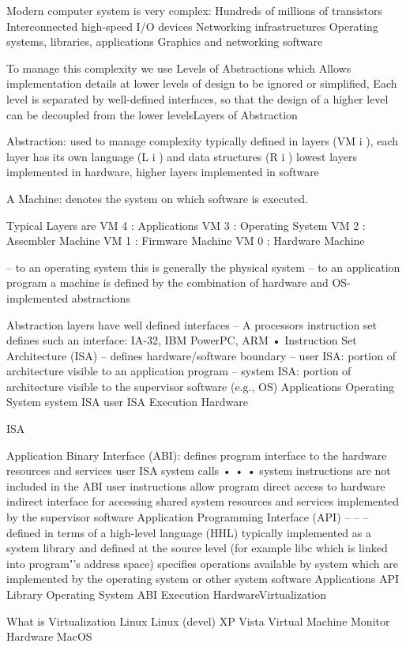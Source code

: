 
Modern computer system is very complex: 
Hundreds of millions of transistors
Interconnected high-speed I/O devices
Networking infrastructures
Operating systems, libraries, applications
Graphics and networking software


To manage this complexity we use Levels of Abstractions which
Allows implementation details at lower levels of design to be ignored or simplified,
Each level is separated by well-defined interfaces, so
that the design of a higher level can be decoupled
from the lower levelsLayers of Abstraction


Abstraction: used to manage complexity typically defined in layers (VM i ), each layer has its own language (L i ) and data structures (R i )   lowest layers implemented in hardware, higher layers implemented in
software

A Machine: denotes the system on which software is executed.

Typical Layers are 
VM 4 : Applications 
VM 3 : Operating System
VM 2 : Assembler Machine
VM 1 : Firmware Machine
VM 0 : Hardware Machine

–  to an operating system this is generally the physical system
–  to an application program a machine is defined by the combination of hardware and OS-implemented abstractions
 

Abstraction layers have well defined interfaces
–  A processors instruction set defines such an interface: IA-32, IBM
PowerPC, ARM
•  Instruction Set Architecture (ISA)
–  defines hardware/software boundary
–  user ISA: portion of architecture visible to an application program
–  system ISA: portion of architecture visible to the supervisor software
(e.g., OS)
Applications
Operating
System
system ISA
user ISA
Execution
Hardware

ISA

Application Binary Interface (ABI): defines program interface to the hardware resources and services 
user ISA
system calls
• 
• 
• 
system instructions are not included in the ABI
user instructions allow program direct access to hardware
indirect interface for accessing shared system resources and services
implemented by the supervisor software
Application Programming Interface (API)
– 
– 
– 
defined in terms of a high-level language (HHL)
typically implemented as a system library and defined at the source level (for example libc which is linked
into programʼ’s address space)
specifies operations available by system which are implemented by the operating system or other system
software
Applications
API
Library
Operating
System
ABI
Execution
HardwareVirtualization

What is Virtualization
Linux
Linux
(devel)
XP
Vista
Virtual Machine Monitor
Hardware
MacOS
